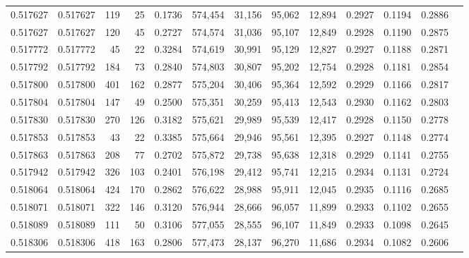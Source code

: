 \begin{tabular}{rrrrrrrrrrrrr}
0.517627 & 0.517627 &   119 &    25 &                                     0.1736 & 574,454 &  31,156 &  95,062 &  12,894 & 0.2927 & 0.1194 & 0.2886 \\
0.517627 & 0.517627 &   120 &    45 &                                     0.2727 & 574,574 &  31,036 &  95,107 &  12,849 & 0.2928 & 0.1190 & 0.2875 \\
0.517772 & 0.517772 &    45 &    22 &                                     0.3284 & 574,619 &  30,991 &  95,129 &  12,827 & 0.2927 & 0.1188 & 0.2871 \\
0.517792 & 0.517792 &   184 &    73 &                                     0.2840 & 574,803 &  30,807 &  95,202 &  12,754 & 0.2928 & 0.1181 & 0.2854 \\
0.517800 & 0.517800 &   401 &   162 &                                     0.2877 & 575,204 &  30,406 &  95,364 &  12,592 & 0.2929 & 0.1166 & 0.2817 \\
0.517804 & 0.517804 &   147 &    49 &                                     0.2500 & 575,351 &  30,259 &  95,413 &  12,543 & 0.2930 & 0.1162 & 0.2803 \\
0.517830 & 0.517830 &   270 &   126 &                                     0.3182 & 575,621 &  29,989 &  95,539 &  12,417 & 0.2928 & 0.1150 & 0.2778 \\
0.517853 & 0.517853 &    43 &    22 &                                     0.3385 & 575,664 &  29,946 &  95,561 &  12,395 & 0.2927 & 0.1148 & 0.2774 \\
0.517863 & 0.517863 &   208 &    77 &                                     0.2702 & 575,872 &  29,738 &  95,638 &  12,318 & 0.2929 & 0.1141 & 0.2755 \\
0.517942 & 0.517942 &   326 &   103 &                                     0.2401 & 576,198 &  29,412 &  95,741 &  12,215 & 0.2934 & 0.1131 & 0.2724 \\
0.518064 & 0.518064 &   424 &   170 &                                     0.2862 & 576,622 &  28,988 &  95,911 &  12,045 & 0.2935 & 0.1116 & 0.2685 \\
0.518071 & 0.518071 &   322 &   146 &                                     0.3120 & 576,944 &  28,666 &  96,057 &  11,899 & 0.2933 & 0.1102 & 0.2655 \\
0.518089 & 0.518089 &   111 &    50 &                                     0.3106 & 577,055 &  28,555 &  96,107 &  11,849 & 0.2933 & 0.1098 & 0.2645 \\
0.518306 & 0.518306 &   418 &   163 &                                     0.2806 & 577,473 &  28,137 &  96,270 &  11,686 & 0.2934 & 0.1082 & 0.2606 \\

\end{tabular}
